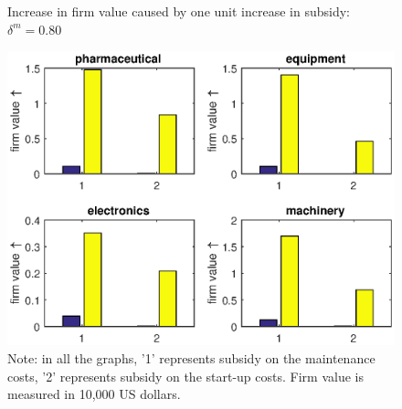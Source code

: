 \documentclass[English]{article}
\begin{document}
\begin{center}
\begin{figure}[H]
\caption{Increase in firm value caused by one unit increase in subsidy: $\delta^m=0.80$}
\label{F8}
\begin{centering}
\includegraphics[width=1\textwidth]{valuechangePerUnit.eps}
\par\end{centering}
\caption*{\small{}Note: in all the graphs, '1' represents subsidy on the maintenance costs, '2' represents subsidy on the start-up costs. Firm value is measured in 10,000 US dollars.}{\small \par}
\end{figure}
\par\end{center}
\end{document}
